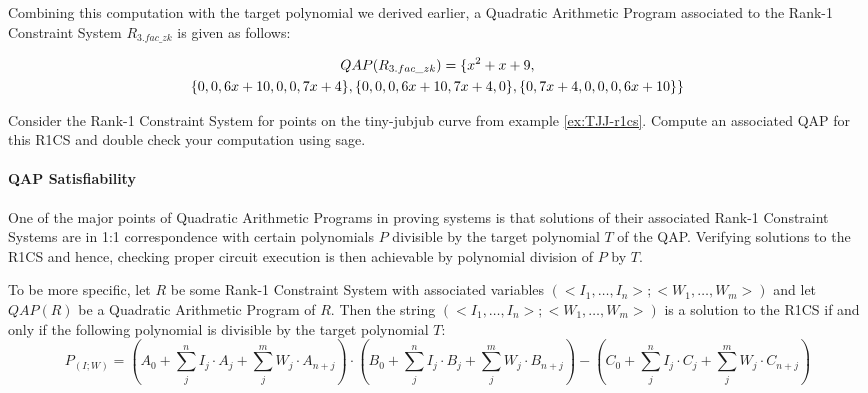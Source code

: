 \begin{example}
Combining this computation with the target polynomial we derived earlier, a Quadratic Arithmetic Program associated to the Rank-1 Constraint System $R_{3.fac\_zk}$ is given as follows:

\begin{multline}
\label{QAP-R3-fac-zk}
QAP(R_{3.fac\_zk}) =\{x^{2}+x+9,\notag\\
 \{0,0,6x+10,0,0,7x+4\},\{0,0,0,6x+10,7x+4,0\},\{0,7x+4,0,0,0,6x+10\}\}
\end{multline}
\end{example}
\begin{exercise}
Consider the Rank-1 Constraint System for points on the tiny-jubjub curve from example \ref{ex:TJJ-r1cs}. Compute an associated QAP for this R1CS and double check your computation using sage.
\end{exercise}
\paragraph{QAP Satisfiability} One of the major points of Quadratic Arithmetic Programs in proving systems is that solutions of their associated Rank-1 Constraint Systems are in 1:1 correspondence with certain polynomials $P$ divisible by the target polynomial $T$ of the QAP. Verifying solutions to the R1CS and hence, checking proper circuit execution is then achievable by polynomial division of $P$ by $T$.

To be more specific, let $R$ be some Rank-1 Constraint System with associated variables $(<I_1,\ldots,I_n>; <W_1,\ldots, W_m>)$ and let $QAP(R)$ be a Quadratic Arithmetic Program of $R$. Then the string $(<I_1,\ldots,I_n>; <W_1,\ldots, W_m>)$ is a solution to the R1CS if and only if the following polynomial is divisible by the target polynomial $T$:
\begin{equation}\label{polynomial-P-IW}
P_{(I;W)} = \scriptstyle \left(A_0 + \sum_{j}^n I_j\cdot A_j + \sum_{j}^m W_j\cdot A_{n+j} \right) \cdot \left(B_0 + \sum_{j}^n I_j\cdot B_j + \sum_{j}^m W_j\cdot B_{n+j} \right) 
-\left(C_0 + \sum_{j}^n I_j\cdot C_j + \sum_{j}^m W_j\cdot C_{n+j} \right)
\end{equation}

